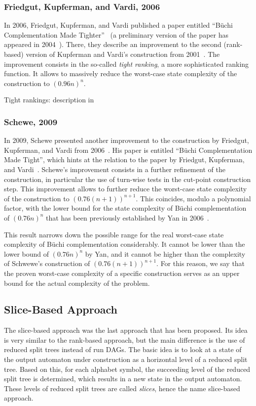 \subsubsection{Friedgut, Kupferman, and Vardi, 2006}
\label{2_fkv06}
In 2006, Friedgut, Kupferman, and Vardi published a paper entitled ``Büchi Complementation Made Tighter''~\cite{friedgut2006buchi} (a preliminary version of the paper has appeared in 2004~\cite{2004_friedgut}). There, they describe an improvement to the second (rank-based) version of Kupferman and Vardi's construction from 2001~\cite{Kupferman:2001}. The improvement consists in the so-called \textit{tight ranking}, a more sophisticated ranking function. It allows to massively reduce the worst-case state complexity of the construction to $(0.96n)^n$.

Tight rankings: description in \cite{fogarty2013unifying}~\cite{2007_vardi}

\subsubsection{Schewe, 2009}
\label{2_schewe09}
In 2009, Schewe presented another improvement to the construction by Friedgut, Kupferman, and Vardi from 2006~\cite{schewe2009buchi}. His paper is entitled ``Büchi Complementation Made Tight'', which hints at the relation to the paper by Friedgut, Kupferman, and Vardi~\cite{friedgut2006buchi}. Schewe's improvement consists in a further refinement of the construction, in particular the use of turn-wise tests in the cut-point construction step. This improvement allows to further reduce the worst-case state complexity of the construction to $\left(0.76\left(n+1\right)\right)^{n+1}$. This coincides, modulo a polynomial factor, with the lower bound for the state complexity of Büchi complementation of $(0.76n)^n$ that has been previously established by Yan in 2006~\cite{2006_yan}\cite{DBLP:journals/corr/abs-0802-1226}.

This result narrows down the possible range for the real worst-case state complexity of Büchi complementation considerably. It cannot be lower than the lower bound of $(0.76n)^n$ by Yan, and it cannot be higher than the complexity of Schwewe's construction of $\left(0.76\left(n+1\right)\right)^{n+1}$. For this reason, we say that the proven worst-case complexity of a specific construction serves as an upper bound for the actual complexity of the problem.


\subsection{Slice-Based Approach}
\label{2_slice-based}
The slice-based approach was the last approach that has been proposed. Its idea is very similar to the rank-based approach, but the main difference is the use of reduced split trees instead of run DAGs. The basic idea is to look at a state of the output automaton under construction as a horizontal level of a reduced split tree. Based on this, for each alphabet symbol, the succeeding level of the reduced split tree is determined, which results in a new state in the output automaton. These levels of reduced split trees are called \textit{slices}, hence the name slice-based approach.

